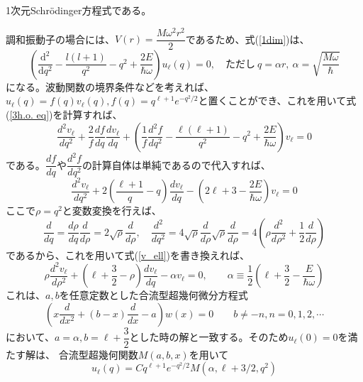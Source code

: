 \documentclass[a4paper]{jsarticle}
\newcommand{\diff}{\mathrm{d}}
\begin{document}
1次元Schr\"{o}dinger方程式である。\par
調和振動子の場合には、$V(r)=\dfrac{M\omega^2r^2}{2}$であるため、式(\ref{1dim})は、
\begin{equation}
  \left(\dfrac{\diff^2}{\diff q^2} -\dfrac{l(l+1)}{q^2} -q^2+\dfrac{2E}{\hbar\omega}\right)
  u_\ell(q)=0,\quad\text{ただし}\ q=\alpha r,\ \alpha=\sqrt{\dfrac{M\omega}{\hbar}}
\label{3h.o. eq}
\end{equation}
になる。波動関数の境界条件などを考えれば、
$u_\ell(q)=f(q)v_{\ell}(q),f(q)=q^{\ell+1}e^{-q^2/2}$と置くことができ、これを用いて式(\ref{3h.o. eq})を計算すれば、
\begin{equation}
  \dfrac{d^2v_{\ell}}{dq^2}+\dfrac{2}{f}\dfrac{df}{dq}\dfrac{dv_{\ell}}{dq}+
  \left(
    \dfrac{1}{f}\dfrac{d^2f}{dq^2}-\dfrac{\ell(\ell+1)}{q^2}-q^2+\dfrac{2E}{\hbar\omega}
  \right)v_\ell=0
\end{equation}
である。$\dfrac{df}{dq}$や$\dfrac{d^2f}{dq^2}$の計算自体は単純であるので代入すれば、
\begin{equation}
  \dfrac{d^2v_{\ell}}{dq^2}+2\left(\dfrac{\ell+1}{q}-q\right)\dfrac{dv_{\ell}}{dq}
  -\left(2\ell + 3 - \dfrac{2E}{\hbar\omega}\right)v_\ell=0
  \label{v_ell}
\end{equation}
ここで$\rho=q^2$と変数変換を行えば、
\begin{equation}
  \dfrac{d}{dq}=\dfrac{d\rho}{dq}\dfrac{d}{d\rho}=2\sqrt{\rho}\dfrac{d}{d\rho},\quad
  \dfrac{d^2}{dq^2}=4\sqrt{\rho}\dfrac{d}{d\rho}\sqrt{\rho}\dfrac{d}{d\rho}
    =4\left(\rho\dfrac{d^2}{d\rho^2}+\dfrac{1}{2}\dfrac{d}{d\rho}\right)
\end{equation}
であるから、これを用いて式(\ref{v_ell})を書き換えれば、
\begin{equation}
  \rho\dfrac{d^2v_{\ell}}{d\rho^2} +
  \left(\ell+\dfrac{3}{2}-\rho\right)\dfrac{dv_{\ell}}{dq} -\alpha v_{\ell}=0,\qquad
  \alpha \equiv \dfrac{1}{2}\left(\ell +\dfrac{3}{2} -\dfrac{E}{\hbar\omega}\right)
\end{equation}
これは、$a,b$を任意定数とした合流型超幾何微分方程式
\begin{equation}
  \left(x\dfrac{d}{dx^2}+(b-x)\dfrac{d}{dx}-a\right)w(x)=0\qquad
  b\neq -n,n=0,1,2,\cdots
\end{equation}
において、$a=\alpha,b=\ell+\dfrac{3}{2}$とした時の解と一致する。そのため$u_\ell(0)=0$を満たす解は、
合流型超幾何関数$M(a,b,x)$を用いて
\begin{equation}
  u_\ell(q) = Cq^{\ell+1}e^{-q^2/2}M(\alpha,\ell+3/2,q^2)
\end{equation}
\end{document}

